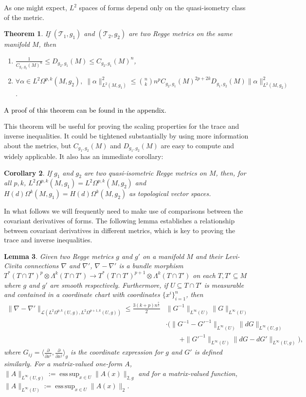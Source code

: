 \documentclass[11pt]{article}
\newtheorem{theorem}{Theorem}
\newtheorem{corollary}[theorem]{Corollary}
\newtheorem{lemma}[theorem]{Lemma}
\newcommand{\pdiff}[2]{\frac{\partial #1}{\partial #2}}
\newcommand{\iprod}[1]{\langle #1 \rangle}
\newcommand{\correction}[2]{\textcolor{red}{}\textcolor{black}{#2}}
\DeclareMathOperator*{\esssup}{ess\,sup}
\begin{document}
As one might expect, $L^2$ spaces of forms depend only on the quasi-isometry class of the metric.

\begin{theorem}\label{L2_equiv}
If $(\mathcal{T}_1,g_1)$ and $(\mathcal{T}_2,g_2)$ are two Regge metrics on the same manifold $M$, then
\begin{enumerate}
\item{$ \frac{1}{C_{g_1,g_2}(M)^n} \le D_{g_2,g_1}(M) \le C_{g_2,g_1}(M)^n$},
\item{$\displaystyle{\forall \alpha \in L^2\Omega^{p,k}(M,g_2), \;\|\alpha\|_{L^2(M,g_1)}^2 \le{n \choose k}n^pC_{g_2,g_1}(M)^{2p + 2k}D_{g_1,g_2}(M)\|\alpha\|_{L^2(M,g_2)}^2}$.}
\end{enumerate}
\end{theorem}

\correction{}{A proof of this theorem can be found in the appendix.}

This theorem will be useful for proving the scaling properties for the trace and inverse inequalities. It could be tightened substantially by using more information about the metrics, but $C_{g_1,g_2}(M)$ and $D_{g_1,g_2}(M)$ are easy to compute and widely applicable. It also has an immediate corollary:
\begin{corollary}
    If $g_1$ and $g_2$ are two quasi-isometric Regge metrics on $M$, then, for all $p,k$, $L^2\Omega^{p,k}(M,g_1) = L^2\Omega^{p,k}(M,g_2)$ and $H(d)\Omega^k(M,g_1) = H(d)\Omega^k(M,g_2)$ as topological vector spaces.
\end{corollary}

In what follows we will frequently need to make use of comparisons between the covariant derivatives of forms. The following lemma establishes a relationship between covariant derivatives in different metrics, which is key to proving the trace and inverse inequalities.

\begin{lemma}
\label{compare_cov}
Given two Regge metrics $g$ and $g'$ on a manifold $M$ and their Levi-Civita connections $\nabla$ and $\nabla'$, $\nabla - \nabla'$ is a bundle morphism $T^*(T \cap T')^p \otimes \Lambda^k(T \cap T') \to T^*(T \cap T')^{p+1} \otimes \Lambda^k(T \cap T')$ on each $T, T' \subseteq M$ where $g$ and $g'$ are smooth respectively. Furthermore, if $U \subseteq T \cap T'$ is measurable and contained in a coordinate chart with coordinates $\{x^i\}_{i = 1}^n$, then
\begin{align*}
\|\nabla - \nabla'\|_{\mathcal{L}(L^2\Omega^{p,k}(U,g),L^2\Omega^{p+1,k}(U,g))} \le \frac{3(k+p)n^\frac{7}{2}}{2}&\|G^{-1}\|_{L^\infty(U)}\|G\|_{L^\infty(U)}\\
&\cdot \big(\|G^{-1} - G'^{-1}\|_{L^\infty(U)}\|dG\|_{L^\infty(U,g)} \\
&\quad\quad + \|G'^{-1}\|_{L^\infty(U)}\|dG - dG'\|_{L^\infty(U,g)}\big),
\end{align*}
where $G_{ij} = \iprod{\pdiff{}{x^i},\pdiff{}{x^j}}_g$ is the coordinate expression for $g$ and $G'$ is defined similarly. For a matrix-valued one-form $A$, $\|A\|_{L^\infty(U,g)} := \esssup_{x \in U} \|A(x)\|_{2,g}$ and for a matrix-valued function, $\|A\|_{L^\infty(U)} := \esssup_{x \in U} \|A(x)\|_2$.
\end{lemma}
\end{document}
